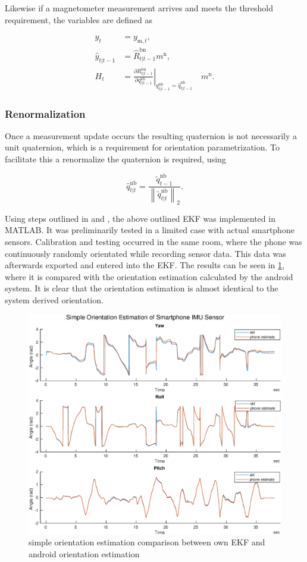 Likewise if a magnetometer measurement arrives and meets the threshold requirement, the variables are defined as

\begin{subequations}
	\begin{align}
	y_{t}&=	y_{\mathrm{m}, t},\\
	\hat{y}_{t | t-1}&=	\hat{R}_{t | t-1}^{\mathrm{bn}} m^{\mathrm{n}},\\
	H_{t}&=	\left.\frac{\partial R_{t | t-1}^{\mathrm{bn}}}{\partial q_{t | t-1}^{\mathrm{nb}}}\right|_{{q_{t | t-1}^{\mathrm{nb}}}=\hat{q}_{t | t-1}^{\mathrm{nb}}} \quad m^{\mathrm{n}}.
	\end{align}
\end{subequations}

\subsubsection{Renormalization}
Once a measurement update occurs the resulting quaternion is not necessarily a unit quaternion, which is a requirement for orientation parametrization. To facilitate this a renormalize the quaternion is required, using

	\begin{equation}
	\hat{q}_{t | t}^{\mathrm{nb}}=\frac{\tilde{q}_{t-1}^{\mathrm{nb}}}{\left\|\tilde{q}_{t | t}^{\mathrm{nb}}\right\|_{2}}.
	\end{equation}

Using steps outlined in \cite{Kok2017} and \cite{Linkoping2013}, the above outlined EKF was implemented in MATLAB. It was preliminarily  tested in a limited case with actual smartphone sensors. Calibration and testing occurred in the same room, where the phone was continuously randomly orientated while recording sensor data. This data was afterwards exported and entered into the EKF. The results can be seen in \cref{fig:simple_stationary_ekf}, where it is compared with the orientation estimation calculated by the android system. It is clear that the orientation estimation is almost identical to the system derived orientation.

\begin{figure}
	\centering
	\includegraphics[width=0.7\linewidth]{images/20201025_2015_simple_stationary_ekf}
	\caption{ simple orientation estimation comparison between own EKF and android orientation estimation}
	\label{fig:simple_stationary_ekf}
\end{figure}

